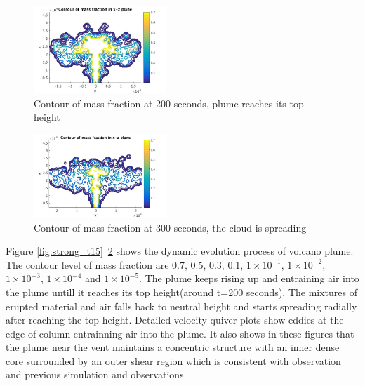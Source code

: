 \documentclass[10pt,a4paper]{article}
\begin{document}
\begin{figure}
\center
\includegraphics[width=5cm]{t200}
\caption{Contour of mass fraction at 200 seconds, plume reaches its top height}
\label{fig:strong_t200}
\end{figure}

\begin{figure}
\center
\includegraphics[width=5cm]{t300}
\caption{Contour of mass fraction at 300 seconds, the cloud is spreading}
\label{fig:strong_t300}
\end{figure}

Figure \ref{fig:strong_t15}~\ref{fig:strong_t300} shows the dynamic evolution process of volcano plume. The contour level of mass fraction are 0.7, 0.5, 0.3, 0.1, $1\times 10 ^{-1}$, $1\times 10 ^{-2}$, $1\times 10 ^{-3}$, $1\times 10^{-4}$ and $1\times 10^{-5}$. The plume keeps rising up and entraining air into the plume untill it reaches its top height(around t=200 seconds). The mixtures of erupted material and air falls back to neutral height and starts spreading radially after reaching the top height. Detailed velocity quiver plots show eddies at the edge of column entrainning air into the plume. It also shows in these figures that the plume near the vent maintains a concentric structure with an inner dense core surrounded by an outer shear region which is consistent with observation and previous simulation and observations.
\end{document}
